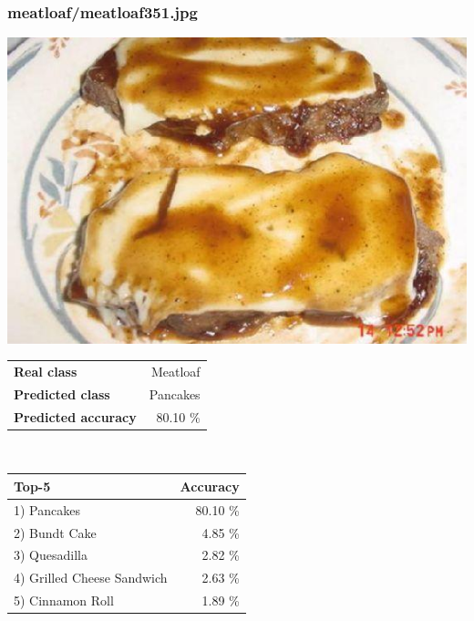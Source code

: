 \subsubsection{meatloaf/meatloaf351.jpg}

\begin{minipage}[t]{0.4\textwidth}
	\vspace{0pt}
	\includegraphics[width=\linewidth]{images/evaluation-images/meatloaf/meatloaf351.jpg}
\end{minipage}
\hfill
\begin{minipage}[t]{0.5\textwidth}
	\vspace{0pt}\raggedright
	\begin{tabularx}{\textwidth}{X r}
		\small \textbf{Real class} & \small Meatloaf\\
		\small \textbf{Predicted class} & \small Pancakes\\
		\small \textbf{Predicted accuracy} & \small 80.10 \%
    \end{tabularx}\\
    
    \vspace{6pt}
	\begin{tabularx}{\textwidth}{X r}
        \small \textbf{Top-5} & \small \textbf{Accuracy} \\
        \hline
		\small 1) Pancakes & \small 80.10 \%\\\small 2) Bundt Cake & \small 4.85 \%\\\small 3) Quesadilla & \small 2.82 \%\\\small 4) Grilled Cheese Sandwich & \small 2.63 \%\\\small 5) Cinnamon Roll & \small 1.89 \%
    \end{tabularx}
\end{minipage}
    
